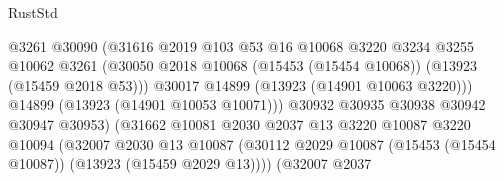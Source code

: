 \begin{lexlean}{RustStd}
\begin{coremodule}
                                            @3261
                                            @30090
                                            (@31616
                                              @2019
                                              @103
                                              @53
                                              @16
                                              @10068
                                              @3220
                                              @3234
                                              @3255
                                              @10062
                                              @3261
                                              (@30050
                                                @2018
                                                @10068
                                                (@15453 (@15454 @10068))
                                                (@13923 (@15459 @2018 @53)))
                                              @30017
                                              @14899
                                              (@13923 (@14901 @10063 @3220)))
                                            @14899
                                            (@13923 (@14901 @10053 @10071)))
                                          @30932
                                          @30935
                                          @30938
                                          @30942
                                          @30947
                                          @30953)
                                        (@31662
                                          @10081
                                          @2030
                                          @2037
                                          @13
                                          @3220
                                          @10087
                                          @3220
                                          @10094
                                          (@32007
                                            @2030
                                            @13
                                            @10087
                                            (@30112
                                              @2029
                                              @10087
                                              (@15453 (@15454 @10087))
                                              (@13923 (@15459 @2029 @13))))
                                          (@32007
                                            @2037

\end{coremodule}
\end{lexlean}
